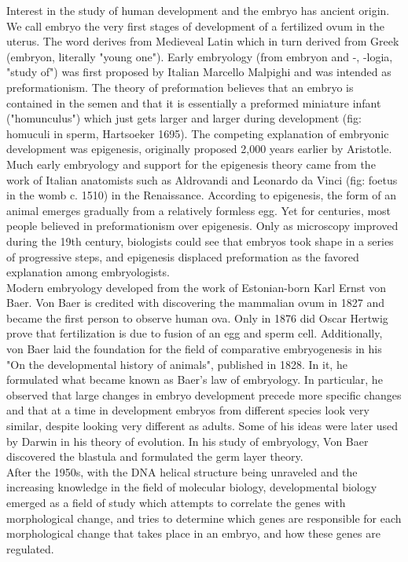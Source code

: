 Interest in the study of human development and the embryo has ancient origin.
We call embryo the very first stages of development of a fertilized ovum in the uterus.
The word derives from Medieveal Latin which in turn derived from Greek \textepsilon\textmu\textbeta\textrho\textupsilon\textomikron\textnu  (embryon, literally "young one").
Early embryology (from embryon and -\textlambda\textomikron\textgamma\textiota\textalpha, -logia, "study of") was first proposed by Italian Marcello Malpighi and was intended as preformationism.
The theory of preformation believes that an embryo is contained in the semen and that it is essentially a preformed miniature infant ("homunculus") which just gets larger and larger during development (fig: homuculi in sperm, Hartsoeker 1695).
The competing explanation of embryonic development was epigenesis, originally proposed 2,000 years earlier by Aristotle. 
Much early embryology and support for the epigenesis theory came from the work of Italian anatomists such as Aldrovandi and Leonardo da Vinci (fig: foetus in the womb c. 1510) in the Renaissance.
According to epigenesis, the form of an animal emerges gradually from a relatively formless egg. 
Yet for centuries, most people believed in preformationism over epigenesis.
Only as microscopy improved during the 19th century, biologists could see that embryos took shape in a series of progressive steps, and epigenesis displaced preformation as the favored explanation among embryologists.\\

Modern embryology developed from the work of Estonian-born Karl Ernst von Baer.
Von Baer is credited with discovering the mammalian ovum in 1827 and became the first person to observe human ova.
Only in 1876 did Oscar Hertwig prove that fertilization is due to fusion of an egg and sperm cell.
Additionally, von Baer laid the foundation for the field of comparative embryogenesis in his "On the developmental history of animals", published in 1828.
In it, he formulated what became known as Baer's law of embryology.
In particular, he observed that large changes in embryo development precede more specific changes and that at a time in development embryos from different species look very similar, despite looking very different as adults.
Some of his ideas were later used by Darwin in his theory of evolution.
In his study of embryology, Von Baer discovered the blastula and formulated the germ layer theory.\\

After the 1950s, with the DNA helical structure being unraveled and the increasing knowledge in the field of molecular biology, developmental biology emerged as a field of study which attempts to correlate the genes with morphological change, and tries to determine which genes are responsible for each morphological change that takes place in an embryo, and how these genes are regulated.

